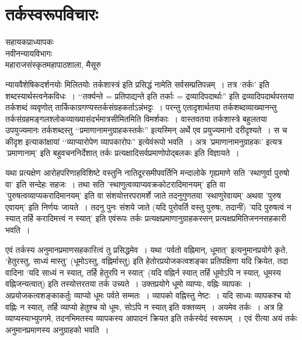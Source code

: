 {\fontsize{15}{17}\selectfont
\presetvalues
\chapter{तर्कस्वरूपविचारः}

\begin{center}
\smallskip

सहायकप्राध्यापकः\\
नवीनन्यायविभागः\\
महाराजसंस्कृतमहापाठशाला, मैसूरु
\addrule
\end{center}
न्यायवैशेषिकदर्शनयोः मिलितयोः तर्कशास्त्रं इति प्रसिद्धं नामेति सर्वसम्प्रतिपन्नम्~। तत्र \-‘तर्कः' इति शब्दस्यार्थस्त्वनेकविधः~। ‘‘तर्क्यन्ते = प्रतिपाद्यन्ते इति तर्काः = द्रव्यादिपदार्थाः'' इति द्रव्यादिपदार्थपरतया तर्कशब्दं व्यवृणोत् तार्किकाग्रगण्यस्तर्कसंग्रहकर्ताऽन्नंभट्टः~। परन्तु एतादृशार्थतया तर्कशब्दव्याख्यानन्तु तर्कसंग्रहमङ्गलश्लोकव्याख्यासंदर्भमात्र\-सीमितमिति विमर्शकाः~। वास्तवतया तर्कशास्त्रे बहुलतया उपयुज्यमानः तर्कशब्दस्तु \break ‘‘प्रमाणानामनुग्राहकस्तर्कः'' इत्यस्मिन् अर्थे एव प्रयुज्यमानो दरीदृश्यते~। स च कीदृश \break इत्याकांक्षायां ‘‘व्याप्यारोपेण व्यापकारोपः'' इत्येवंरूपो भवति~। अत्र 'प्रमाणानामनुग्राहकः' इत्यत्र 'प्रमाणानाम्' इति बहुवचननिर्देशात् तर्कः प्रत्यक्षादिसर्वप्रमाणोपोद्बलकः इति विज्ञायते~। 

यथा प्रत्यक्षेण आरोहपरिणाहविशिष्टे वस्तुनि नातिदूरसमीपवर्तिनि मन्दालोके गृह्यमाणे सति 'स्थाणुर्वा पुरुषो वा' इति सन्देहः सहजः~। तथा सति 'स्थाणुत्वव्याप्यवक्रकोटरादि\-मानयम्' इति वा 'पुरुषत्वव्याप्यकरादिमानयम्' इति वा संशयोत्तरपरामर्शे जाते तदनुगुणतया 'स्थाणुरेवायम्' अथवा 'पुरुष एवायम्' इति निर्णयः जायते~। तदनु पुनः संशये जाते (यदि पुरोवर्ति वस्तु पुरुषः, तदानीं) 'यदि पुरुषत्वं न स्यात् तर्हि करादिमत्त्वं न स्यात्' इति एवंरूपः तर्कः प्रत्यक्षप्रमाणानुग्राहकस्सन् प्रत्यक्षप्रमितिजननसहकारी भवति~। 

एवं तर्कस्य अनुमानप्रमाणसहकारित्वं तु प्रसिद्धमेव~। यथा ‘पर्वतो वह्निमान्, धूमात्' इत्यनुमानप्रयोगे कृते, ‘हेतुरस्तु, साध्यं मास्तु' (धूमोऽस्तु, वह्निर्मास्तु) इति हेतोरप्रयोजकत्वशङ्का प्रतिपक्षिणा यदि क्रियेत, तदा वादिना ‘यदि साध्यं न स्यात्, तर्हि हेतुरपि न स्यात्' (यदि वह्निर्न स्यात् तर्हि धूमोऽपि न स्यात्, धूमस्य वह्निजन्यत्वात्) इति तस्योत्तरतया तर्क उच्यते~। उक्तप्रयोगे धूमो व्याप्यः, वह्निः व्यापकः~। अप्रयोजकत्वशङ्काकर्तुः व्याप्यो धूमः पर्वते सम्मतः~। व्यापको वह्निस्तु नेष्टः~। यदि साध्यः व्यापकश्च यो वह्निः न स्यात्, तर्हि व्याप्यो हेतुश्च यो धूमः, सोऽपि न स्यात् इति वक्तव्यम्~। अयमेव तर्कः~। अत्र हि व्याप्यस्याभ्युपगमे, तदनभिमतस्य व्यापकस्य आपादनं क्रियत इति तर्कस्येदं स्वरूपम्~। एवं रीत्या अयं तर्कः अनुमानप्रमाणस्य अनुग्राहको भवति~। 

}
